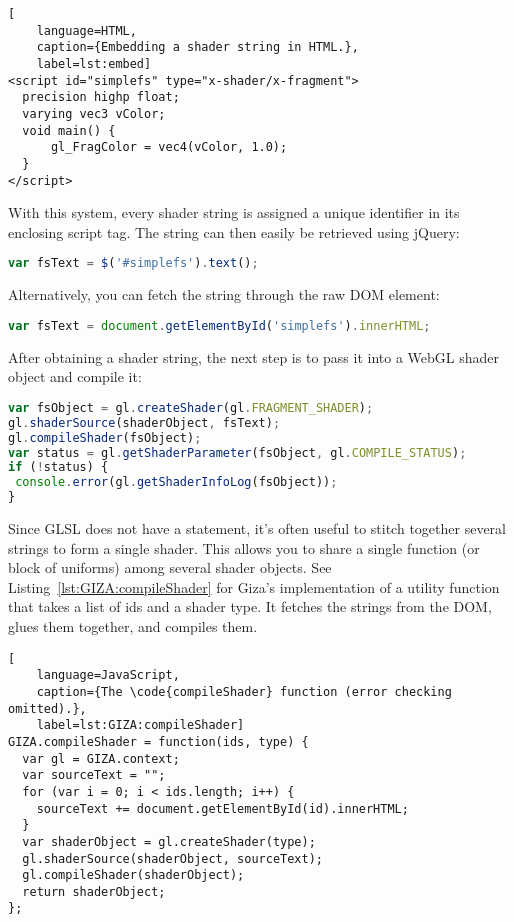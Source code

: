 \begin{lstlisting}[
    language=HTML,
    caption={Embedding a shader string in HTML.},
    label=lst:embed]
<script id="simplefs" type="x-shader/x-fragment">
  precision highp float;
  varying vec3 vColor;
  void main() {
      gl_FragColor = vec4(vColor, 1.0);
  }
</script>
\end{lstlisting}

With this system, every shader string is assigned a unique identifier in its enclosing script tag.  The string can then easily be retrieved using jQuery:

\begin{lstlisting}[language=JavaScript]
var fsText = $('#simplefs').text();
\end{lstlisting} %

Alternatively, you can fetch the string through the raw DOM element:

\begin{lstlisting}[language=JavaScript]
var fsText = document.getElementById('simplefs').innerHTML;
\end{lstlisting}

After obtaining a shader string, the next step is to pass it into a WebGL shader object and compile it:

\begin{lstlisting}[language=JavaScript]
var fsObject = gl.createShader(gl.FRAGMENT_SHADER);
gl.shaderSource(shaderObject, fsText);
gl.compileShader(fsObject);
var status = gl.getShaderParameter(fsObject, gl.COMPILE_STATUS);
if (!status) {
 console.error(gl.getShaderInfoLog(fsObject));
}
\end{lstlisting}

Since GLSL does not have a  statement, it's often useful to stitch together several strings to form a single shader.  This allows you to share a single function (or block of uniforms) among several shader objects.  See Listing~\ref{lst:GIZA:compileShader} for Giza's implementation of a utility function that takes a list of ids and a shader type.  It fetches the strings from the DOM, glues them together, and compiles them.

\begin{lstlisting}[
    language=JavaScript,
    caption={The \code{compileShader} function (error checking omitted).},
    label=lst:GIZA:compileShader]
GIZA.compileShader = function(ids, type) {
  var gl = GIZA.context;
  var sourceText = "";
  for (var i = 0; i < ids.length; i++) {
    sourceText += document.getElementById(id).innerHTML;
  }
  var shaderObject = gl.createShader(type);
  gl.shaderSource(shaderObject, sourceText);
  gl.compileShader(shaderObject);
  return shaderObject;
};
\end{lstlisting}

